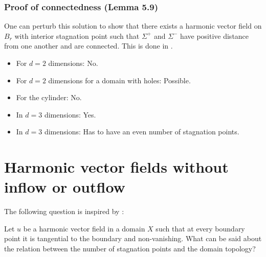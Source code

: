 \begin{frame}
  \frametitle{Proof of connectedness (Lemma 5.9)}
  \begin{figure}
    \centering
    \resizebox{\textwidth}{!}{
      
    }
  \end{figure}
\end{frame}


\begin{frame}
  \begin{remark}
    One can perturb this solution to show that there exists a harmonic vector field
    on $B_r$ with interior stagnation point such that $\Sigma^+$ and $\Sigma^-$ have positive distance
    from one another and are connected.
    This is done in \autocite[Ex.\ 5.12]{Koppenhoefer2024}.
  \end{remark}
\end{frame}

\begin{frame}
  \questionFlowthrough
  \begin{answer}
    \begin{itemize}
      \item For $d=2$ dimensions: No.
      \item For $d=2$ dimensions for a domain with holes: Possible.
      \item For the cylinder: No.
      \item In $d=3$ dimensions: Yes.
      \item In $d=3$ dimensions: Has to have an even number of stagnation points.
    \end{itemize}
  \end{answer}
\end{frame}

\section{Harmonic vector fields without inflow or outflow}

\begin{frame}
  The following question is inspired by \autocite{Lortz1970}:
  \begin{question}
    Let $u$ be a harmonic vector field in a domain $X$ such that at every boundary point it is tangential to the boundary
    and non-vanishing.
    What can be said about the relation between the number of stagnation points and the domain topology?
  \end{question}
\end{frame}

